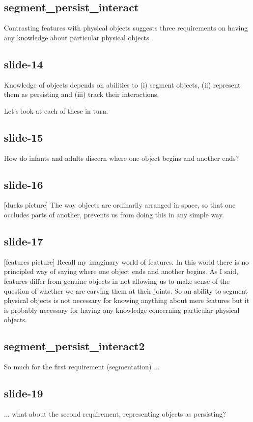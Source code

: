 \documentclass[12pt,\papersize]{extarticle}
\begin{document}
\subsection{segment\_persist\_interact}
Contrasting features with physical objects suggests three requirements on having any 
knowledge about particular physical objects.
 
\subsection{slide-14}
Knowledge of objects depends on abilities to (i) segment objects, (ii) represent them as 
persisting and (iii) track their interactions.
 
Let's look at each of these in turn.
 
\subsection{slide-15}
How do infants and adults discern where one object begins and another ends?
 
\subsection{slide-16}
[ducks picture]
The way objects are ordinarily arranged in space, so that one occludes parts of another, 
prevents us from doing this in any simple way.
 
\subsection{slide-17}
[features picture]
Recall my imaginary world of features.  In this world there is no principled way of saying 
where one object ends and another begins.
As I said, features differ from genuine objects in not allowing us to make sense of the question of 
whether we are carving them at their joints.
So an ability to segment physical objects is not necessary for knowing anything about
mere features but it is probably necessary for having any knowledge 
concerning particular physical objects.
 
\subsection{segment\_persist\_interact2}
So much for the first requirement (segmentation) ...
 
\subsection{slide-19}
... what about the second requirement, representing objects as persisting?
 
\end{document}
